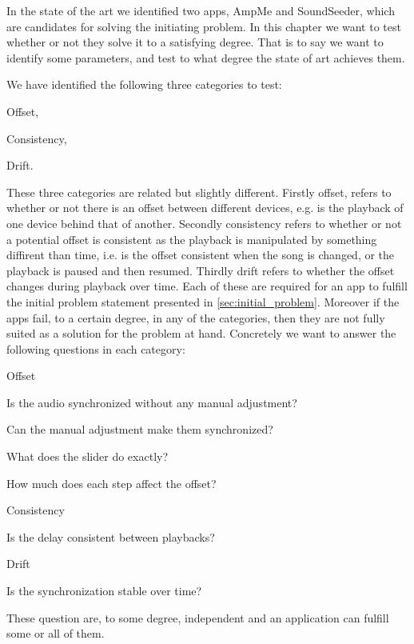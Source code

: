 In the state of the art we identified two apps, AmpMe and SoundSeeder, which are candidates for solving the initiating problem.
In this chapter we want to test whether or not they solve it to a satisfying degree.
That is to say we want to identify some parameters, and test to what degree the state of art achieves them.

We have identified the following three categories to test:
\begin{eletterate*}
    \item Offset,
    \item Consistency,
    \item Drift.
\end{eletterate*}

These three categories are related but slightly different.
Firstly offset, refers to whether or not there is an offset between different devices, e.g. is the playback of one device behind that of another.
Secondly consistency refers to whether or not a potential offset is consistent as the playback is manipulated by something diffirent than time, i.e. is the offset consistent when the song is changed, or the playback is paused and then resumed.
Thirdly drift refers to whether the offset changes during playback over time.
Each of these are required for an app to fulfill the initial problem statement presented in \vref{sec:initial_problem}.
Moreover if the apps fail, to a certain degree, in any of the categories, then they are not fully suited as a solution for the problem at hand.
Concretely we want to answer the following questions in each category:
\begin{eletterate}
    \item Offset
    \begin{enumberate}
        \item Is the audio synchronized without any manual adjustment?
        \item Can the manual adjustment make them synchronized?
        \begin{enumberate}
            \item What does the slider do exactly?
            \item How much does each step affect the offset?
        \end{enumberate}
    \end{enumberate}
    \item Consistency
    \begin{enumberate}[start=3]
        \item Is the delay consistent between playbacks?
    \end{enumberate}
    \item Drift
    \begin{enumberate}[start=4]
        \item Is the synchronization stable over time?
    \end{enumberate}
\end{eletterate}

These question are, to some degree, independent and an application can fulfill some or all of them. 
